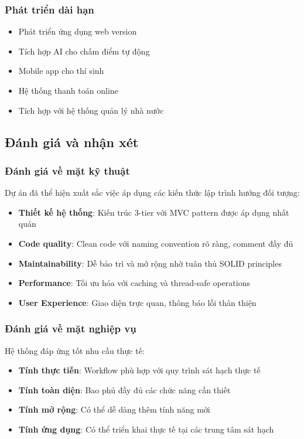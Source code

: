 \documentclass[12pt,a4paper]{article}
\begin{document}
\subsubsection{Phát triển dài hạn}
\begin{itemize}
    \item Phát triển ứng dụng web version
    \item Tích hợp AI cho chấm điểm tự động
    \item Mobile app cho thí sinh
    \item Hệ thống thanh toán online
    \item Tích hợp với hệ thống quản lý nhà nước
\end{itemize}

\subsection{Đánh giá và nhận xét}

\subsubsection{Đánh giá về mặt kỹ thuật}
Dự án đã thể hiện xuất sắc việc áp dụng các kiến thức lập trình hướng đối tượng:

\begin{itemize}
    \item \textbf{Thiết kế hệ thống}: Kiến trúc 3-tier với MVC pattern được áp dụng nhất quán
    \item \textbf{Code quality}: Clean code với naming convention rõ ràng, comment đầy đủ
    \item \textbf{Maintainability}: Dễ bảo trì và mở rộng nhờ tuân thủ SOLID principles
    \item \textbf{Performance}: Tối ưu hóa với caching và thread-safe operations
    \item \textbf{User Experience}: Giao diện trực quan, thông báo lỗi thân thiện
\end{itemize}

\subsubsection{Đánh giá về mặt nghiệp vụ}
Hệ thống đáp ứng tốt nhu cầu thực tế:

\begin{itemize}
    \item \textbf{Tính thực tiễn}: Workflow phù hợp với quy trình sát hạch thực tế
    \item \textbf{Tính toàn diện}: Bao phủ đầy đủ các chức năng cần thiết
    \item \textbf{Tính mở rộng}: Có thể dễ dàng thêm tính năng mới
    \item \textbf{Tính ứng dụng}: Có thể triển khai thực tế tại các trung tâm sát hạch
\end{itemize}
\end{document}
